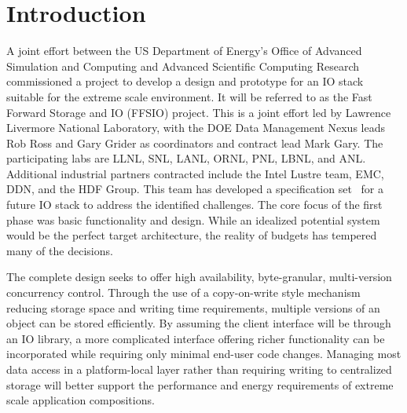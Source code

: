 \documentclass{sig-alt-gov2}
\begin{document}

\section{Introduction}


A joint effort between the US Department of
Energy's Office of Advanced Simulation and Computing and Advanced Scientific
Computing Research commissioned a project to develop a design and prototype for
an IO stack suitable for the extreme scale environment. It will be referred to
as the Fast Forward Storage and IO (FFSIO) project. This is a joint effort led
by Lawrence Livermore National Laboratory, with the DOE Data Management Nexus
leads Rob Ross and Gary Grider as coordinators and contract lead Mark Gary. The
participating labs are LLNL, SNL, LANL, ORNL, PNL, LBNL, and ANL.  Additional
industrial partners contracted include the Intel Lustre team, EMC, DDN, and the
HDF Group. This team has developed a specification
set~\cite{fastforward:2014:docs} for a future IO stack to address the
identified challenges. The core focus of the first phase
was basic functionality and design. While an idealized potential system would
be the perfect target architecture, the reality of budgets has tempered many of
the decisions.

The complete design seeks to offer high availability, byte-granular,
multi-version concurrency control. Through the use of a copy-on-write style
mechanism reducing storage space and writing time requirements, multiple
versions of an object can be stored efficiently. By assuming the client
interface will be through an IO library, a more complicated interface offering
richer functionality can be incorporated while requiring only minimal end-user
code changes.  Managing most data access in a platform-local layer rather than
requiring writing to centralized storage will better support the performance
and energy requirements of extreme scale application compositions.
\end{document}
